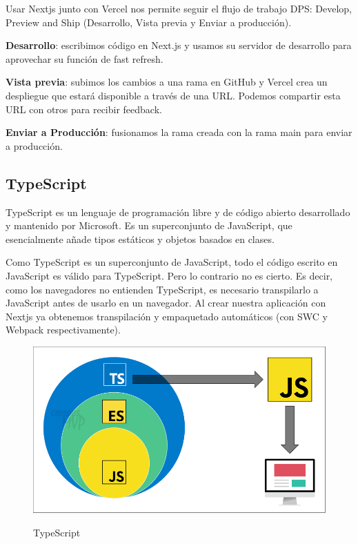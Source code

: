\documentclass[12pt,twoside,titlepage]{report}
\begin{document}
Usar Nextjs junto con Vercel nos permite seguir el flujo de trabajo DPS: Develop, Preview and Ship (Desarrollo, Vista previa y Enviar a producción).

\begin{compactitem}
    \item \textbf{Desarrollo}: escribimos código en Next.js y usamos su servidor de desarrollo para aprovechar su función de fast refresh.
    \item \textbf{Vista previa}: subimos los cambios a una rama en GitHub y Vercel crea un despliegue que estará disponible a través de una URL. Podemos compartir esta URL con otros para recibir feedback.
    \item \textbf{Enviar a Producción}: fusionamos la rama creada con la rama main para enviar a producción.
\end{compactitem}

\subsection{TypeScript}

TypeScript es un lenguaje de programación libre y de código abierto desarrollado y mantenido por Microsoft. Es un superconjunto de JavaScript, que esencialmente añade tipos estáticos y objetos basados en clases.

Como TypeScript es un superconjunto de JavaScript, todo el código escrito en JavaScript es válido para TypeScript. Pero lo contrario no es cierto. Es decir, como los navegadores no entienden TypeScript, es necesario transpilarlo a JavaScript antes de usarlo en un navegador. Al crear nuestra aplicación con Nextjs ya obtenemos transpilación y empaquetado automáticos (con SWC y Webpack respectivamente).

\begin{figure}[H]
    \centering
    \includegraphics[scale=0.4]{TypeScript/TypeScript}
    \label{fig:TypeScript}
    \caption{TypeScript}
\end{figure}
\end{document}
